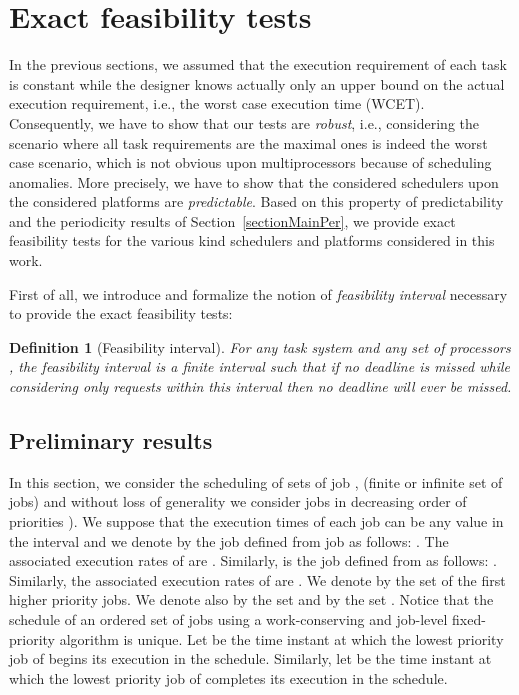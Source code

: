 \documentclass[a4paper,11pt]{article}
\newtheorem{Definition}{Definition}
\begin{document}
\section{Exact feasibility tests} \label{sectionExactFebTest}

In the previous sections, we assumed that the execution requirement of
each task is constant while the designer knows actually only an upper
bound on the actual execution requirement, i.e., the worst case
execution time (WCET). Consequently, we have to show that our tests are
\emph{robust}, i.e., considering the scenario where all task
requirements are the maximal ones is indeed the worst case scenario,
which is not obvious upon multiprocessors because of scheduling
anomalies. More precisely, we have to show that the considered
schedulers upon the considered platforms are \emph{predictable}. Based
on this property of predictability and the periodicity results of
Section~\ref{sectionMainPer}, we provide exact feasibility tests for
the various kind schedulers and platforms considered in this work.

First of all, we introduce and formalize the notion of \emph{feasibility
interval} necessary to provide the exact feasibility tests:

\begin{Definition}[Feasibility interval]
  For any task system  and any
  set of  processors , the {\em feasibility
    interval} is a finite interval such that if no deadline is missed
  while considering only requests within this interval then no
  deadline will ever be missed.
\end{Definition}

\subsection{Preliminary results} \label{sectPremRes}



In this section, we consider the scheduling of sets of job , (finite or infinite set of jobs) and without loss of generality we consider jobs in decreasing order of priorities ). We suppose that the execution times of each job  can be any value in the interval  and we denote by  the job defined from job  as follows:
. The associated execution rates of
 are .  Similarly,
 is the job defined from  as follows:
. Similarly, the associated execution rates
of  are . We denote
by  the set of the first  higher priority jobs. We denote
also by  the set  and by
 the set . Notice that the
schedule of an ordered set of jobs using a work-conserving and
job-level fixed-priority algorithm is unique. Let  be the time instant at
which the lowest priority job of  begins its execution in the
schedule. Similarly, let  be the time instant at which the
lowest priority job of  completes its execution in the schedule.
\end{document}
